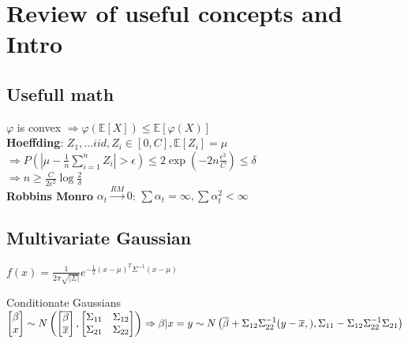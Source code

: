 \section{Review of useful concepts and Intro}

\subsection{Usefull math}
$\varphi$ is convex $\Rightarrow \varphi(\mathbb{E}[X]) \leq  \mathbb{E}[\varphi(X)]$\\
\textbf{Hoeffding}: $Z_1,\dots iid, Z_i\in [0,C], \mathbb{E}[Z_i]=\mu$\\
$\Rightarrow P\left(\left\lvert \mu - \frac{1}{n}\sum_{i=1}^n Z_i\right\rvert > \epsilon \right)\leq 2 \exp(-2n\frac{\epsilon^2}{C})\leq \delta$\\
$\Rightarrow n \geq \frac{C}{2\epsilon^2}\log\frac{2}{\delta}$\\
\textbf{Robbins Monro} $\alpha_t \xrightarrow{RM} 0$: $\sum \alpha_t = \infty, \sum \alpha_t^2 < \infty$ 
\subsection{Multivariate Gaussian}
$f(x) = \frac{1}{2\pi \sqrt{|\Sigma|}} e^{- \frac{1}{2} (x-\mu)^T \Sigma^{-1} (x-\mu)}$

Conditionate Gaussians\\
\(
\begin{bmatrix} \beta \\ x \end{bmatrix} \sim N\left(\begin{bmatrix}\bar{\beta} \\ \bar{x}\end{bmatrix},\begin{bmatrix} \Sigma_{11}&\Sigma_{12} \\\Sigma_{21}&\Sigma_{22} \end{bmatrix}\right)
\Rightarrow\beta\vert x=y \sim \\ N\left(\bar{\beta} + \Sigma_{12}\Sigma^{-1}_{22}(y-\bar{x}, ) , \Sigma_{11}-\Sigma_{12}\Sigma^{-1}_{22}\Sigma_{21}\right)
\)%


